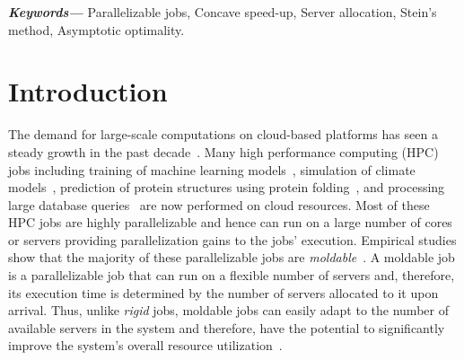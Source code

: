 \documentclass[a4paper]{article}
\theoremstyle{plain}
\theoremstyle{definition}
\theoremstyle{case}
\theoremstyle{remark}
\providecommand{\keywords}[1]
{
  \small	
  \textbf{\textit{Keywords---}} #1
}
\begin{document}
\keywords{Parallelizable jobs, Concave speed-up, Server allocation, Stein's method, Asymptotic optimality.}
\maketitle


\section{Introduction}
The demand for large-scale computations on cloud-based platforms has seen a steady growth in the past decade~\cite{quasar}.
Many high performance computing  (HPC) jobs including training of machine learning models~\cite{TensorFlow_2016}, simulation of climate models~\cite{climate}, prediction of protein structures using protein folding~\cite{protein}, and processing large database queries~\cite{database}
are now performed on cloud resources. 
Most of these HPC jobs are highly parallelizable and hence can run on a large number of cores or servers providing parallelization gains to the jobs' execution. Empirical studies show that the majority of these parallelizable jobs are {\em moldable}~\cite{moldable3}. A moldable job is a parallelizable job that can run on a flexible number of servers and, therefore, its execution time is determined by the number of servers allocated to it upon arrival. Thus, unlike {\em rigid} jobs, moldable jobs can easily adapt to the number of available servers in the system and therefore, have the potential to significantly improve the system's overall resource utilization~\cite{moldable1,moldable2}.

\end{document}
